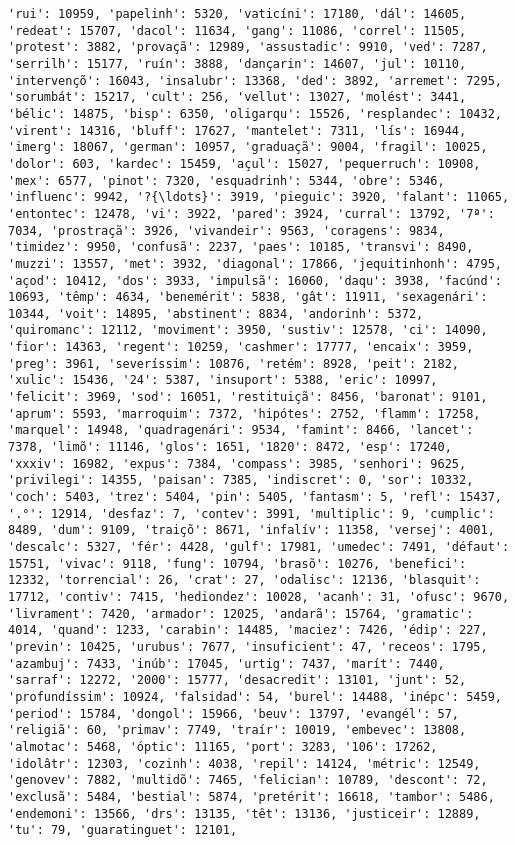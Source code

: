\documentclass[11pt]{article}
\begin{document}
\begin{Verbatim}[commandchars=\\\{\}]
'rui': 10959, 'papelinh': 5320, 'vaticíni': 17180, 'dál': 14605, 'redeat': 15707, 'dacol': 11634, 'gang': 11086, 'correl': 11505, 'protest': 3882, 'provaçã': 12989, 'assustadic': 9910, 'ved': 7287, 'serrilh': 15177, 'ruín': 3888, 'dançarin': 14607, 'jul': 10110, 'intervençõ': 16043, 'insalubr': 13368, 'ded': 3892, 'arremet': 7295, 'sorumbát': 15217, 'cult': 256, 'vellut': 13027, 'molést': 3441, 'bélic': 14875, 'bisp': 6350, 'oligarqu': 15526, 'resplandec': 10432, 'virent': 14316, 'bluff': 17627, 'mantelet': 7311, 'lís': 16944, 'imerg': 18067, 'german': 10957, 'graduaçã': 9004, 'fragil': 10025, 'dolor': 603, 'kardec': 15459, 'açul': 15027, 'pequerruch': 10908, 'mex': 6577, 'pinot': 7320, 'esquadrinh': 5344, 'obre': 5346, 'influenc': 9942, '?{\ldots}': 3919, 'pieguic': 3920, 'falant': 11065, 'entontec': 12478, 'vi': 3922, 'pared': 3924, 'curral': 13792, '7ª': 7034, 'prostraçã': 3926, 'vivandeir': 9563, 'coragens': 9834, 'timidez': 9950, 'confusã': 2237, 'paes': 10185, 'transvi': 8490, 'muzzi': 13557, 'met': 3932, 'diagonal': 17866, 'jequitinhonh': 4795, 'açod': 10412, 'dos': 3933, 'impulsã': 16060, 'daqu': 3938, 'facúnd': 10693, 'têmp': 4634, 'benemérit': 5838, 'gât': 11911, 'sexagenári': 10344, 'voit': 14895, 'abstinent': 8834, 'andorinh': 5372, 'quiromanc': 12112, 'moviment': 3950, 'sustiv': 12578, 'ci': 14090, 'fior': 14363, 'regent': 10259, 'cashmer': 17777, 'encaix': 3959, 'preg': 3961, 'severíssim': 10876, 'retém': 8928, 'peit': 2182, 'xulic': 15436, '24': 5387, 'insuport': 5388, 'eric': 10997, 'felicit': 3969, 'sod': 16051, 'restituiçã': 8456, 'baronat': 9101, 'aprum': 5593, 'marroquim': 7372, 'hipótes': 2752, 'flamm': 17258, 'marquel': 14948, 'quadragenári': 9534, 'famint': 8466, 'lancet': 7378, 'limõ': 11146, 'glos': 1651, '1820': 8472, 'esp': 17240, 'xxxiv': 16982, 'expus': 7384, 'compass': 3985, 'senhori': 9625, 'privilegi': 14355, 'paisan': 7385, 'indiscret': 0, 'sor': 10332, 'coch': 5403, 'trez': 5404, 'pin': 5405, 'fantasm': 5, 'refl': 15437, '.°': 12914, 'desfaz': 7, 'contev': 3991, 'multiplic': 9, 'cumplic': 8489, 'dum': 9109, 'traiçõ': 8671, 'infalív': 11358, 'versej': 4001, 'descalc': 5327, 'fér': 4428, 'gulf': 17981, 'umedec': 7491, 'défaut': 15751, 'vivac': 9118, 'fung': 10794, 'brasõ': 10276, 'benefici': 12332, 'torrencial': 26, 'crat': 27, 'odalisc': 12136, 'blasquit': 17712, 'contiv': 7415, 'hediondez': 10028, 'acanh': 31, 'ofusc': 9670, 'livrament': 7420, 'armador': 12025, 'andarã': 15764, 'gramatic': 4014, 'quand': 1233, 'carabin': 14485, 'maciez': 7426, 'édip': 227, 'previn': 10425, 'urubus': 7677, 'insuficient': 47, 'receos': 1795, 'azambuj': 7433, 'inúb': 17045, 'urtig': 7437, 'marít': 7440, 'sarraf': 12272, '2000': 15777, 'desacredit': 13101, 'junt': 52, 'profundíssim': 10924, 'falsidad': 54, 'burel': 14488, 'inépc': 5459, 'period': 15784, 'dongol': 15966, 'beuv': 13797, 'evangél': 57, 'religiã': 60, 'primav': 7749, 'traír': 10019, 'embevec': 13808, 'almotac': 5468, 'óptic': 11165, 'port': 3283, '106': 17262, 'idolâtr': 12303, 'cozinh': 4038, 'repil': 14124, 'métric': 12549, 'genovev': 7882, 'multidõ': 7465, 'felician': 10789, 'descont': 72, 'exclusã': 5484, 'bestial': 5874, 'pretérit': 16618, 'tambor': 5486, 'endemoni': 13566, 'drs': 13135, 'têt': 13136, 'justiceir': 12889, 'tu': 79, 'guaratinguet': 12101, 
\end{Verbatim}
\end{document}
